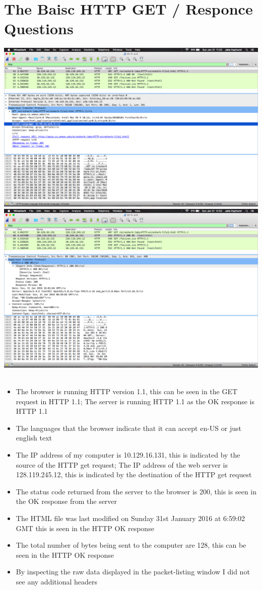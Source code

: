 \documentclass{article}
\begin{document}
\section {The Baisc HTTP GET / Responce Questions}
\includegraphics[width=\textwidth]{SimpleHTTPGet}\\
\includegraphics[width=\textwidth]{SimpleHTTPOk}\\\\
\begin{itemize}
  \item The browser is running HTTP version 1.1, this can be seen in the GET request in HTTP 1.1; The server is running HTTP 1.1 as the OK response is HTTP 1.1
  \item The languages that the browser indicate that it can accept en-US or just english text
  \item The IP address of my computer is 10.129.16.131, this is indicated by the source of the HTTP get request; The IP address of the web server is 128.119.245.12, this is indicated by the destination of the HTTP get request
  \item The status code returned from the server to the browser is 200, this is seen in the OK response from the server
  \item The HTML file was last modified on Sunday 31st January 2016 at 6:59:02 GMT this is seen in the HTTP OK response
  \item The total number of bytes being sent to the computer are 128, this can be seen in the HTTP OK response
  \item By inspecting the raw data displayed in the packet-listing window I did not see any additional headers
\end{itemize}
\end{document}
